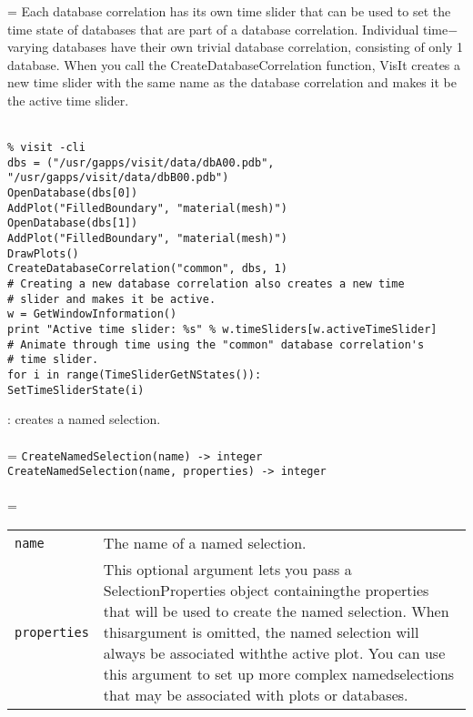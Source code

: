 \documentclass[10pt,a4paper]{report}
\begin{document}
\hangindent=\parindent
Each database correlation has its own time slider that can be used to set the time state of databases that are part of a database correlation. Individual time$-$varying databases have their own trivial database correlation, consisting of only 1 database. When you call the CreateDatabaseCorrelation function, VisIt creates a new time slider with the same name as the database correlation and makes it be the active time slider. \\[-3mm] 

\\[-6mm]
\begin{verbatim}% visit -cli
dbs = ("/usr/gapps/visit/data/dbA00.pdb",
"/usr/gapps/visit/data/dbB00.pdb")
OpenDatabase(dbs[0])
AddPlot("FilledBoundary", "material(mesh)")
OpenDatabase(dbs[1])
AddPlot("FilledBoundary", "material(mesh)")
DrawPlots()
CreateDatabaseCorrelation("common", dbs, 1)
# Creating a new database correlation also creates a new time 
# slider and makes it be active.
w = GetWindowInformation()
print "Active time slider: %s" % w.timeSliders[w.activeTimeSlider]
# Animate through time using the "common" database correlation's 
# time slider.
for i in range(TimeSliderGetNStates()):
SetTimeSliderState(i)
\end{verbatim}
\newpage


{}
: creates a named selection.\\[-3mm]

 \\ 
\hangindent=\parindent 
\verb!CreateNamedSelection(name) -> integer!\\ 
\verb!CreateNamedSelection(name, properties) -> integer!\\ [-3mm]

 \\ 
\hangindent=\parindent 
\begin{tabular}{lp{9cm}}
\verb!name! & The name of a named selection. \\
\verb!properties! & This optional argument lets you pass a SelectionProperties object containingthe properties that will be used to create the named selection. When thisargument is omitted, the named selection will always be associated withthe active plot. You can use this argument to set up more complex namedselections that may be associated with plots or databases. \\
\end{tabular} \\[-2mm]
\end{document}
